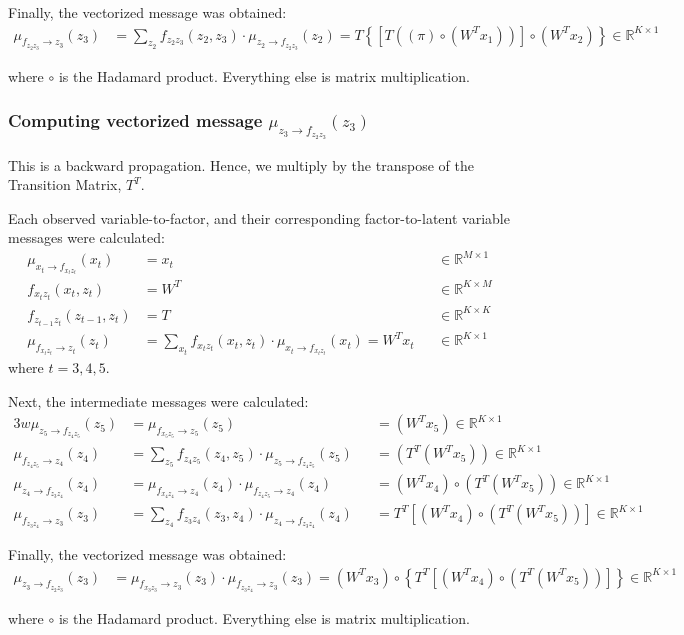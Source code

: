 \documentclass[a4paper,12pt]{article}
\newcommand{\msgNtoF}[2]{\mu_{#1 \rightarrow f_{#2}}(#1)}
\newcommand{\msgFtoN}[2]{\mu_{f_{#1} \rightarrow #2}(#2)}
\newcommand{\factorChris}[2]{f_{#1 #2}(#1, #2)}
\begin{document}
Finally, the vectorized message was obtained:
\begin{align}
\msgFtoN{z_2 z_3}{z_3} & = \sum_{z_2} \factorChris{z_2}{z_3} \cdot \msgNtoF{z_2}{z_2 z_3} = T \left \{ \left[ T \left( (\pi) \circ (W^{T} x_1) \right) \right] \circ \left( W^{T} x_2 \right) \right \} \in \mathbb{R}^{K \times 1}
\end{align}

where $\circ$ is the Hadamard product. Everything else is matrix multiplication.

\clearpage
\subsubsection{Computing vectorized message $\msgNtoF{z_3}{z_2 z_3}$}

This is a backward propagation. Hence, we multiply by the transpose of the Transition Matrix, $T^{T}$. 

Each observed variable-to-factor, and their corresponding factor-to-latent variable messages were calculated:
\begin{align}
\msgNtoF{x_t}{x_t z_t} & = x_t &&\in \mathbb{R}^{M \times 1} \\
\factorChris{x_{t}}{z_{t}} & = W^{T} &&\in \mathbb{R}^{K \times M} \\
\factorChris{z_{t-1}}{z_{t}} & = T &&\in \mathbb{R}^{K \times K}  \\
\msgFtoN{x_t z_t}{z_t} & = \sum_{x_t} \factorChris{x_t}{z_t} \cdot \msgNtoF{x_t}{x_t z_t} = W^{T} x_t && \in \mathbb{R}^{K \times 1}
\end{align}
where $ t = 3, 4, 5 $.

Next, the intermediate messages were calculated:
\begin{alignat}{3}w
\msgNtoF{z_5}{z_4 z_5} & = \msgFtoN{x_5 z_5}{z_5} && = (W^{T} x_5) \in \mathbb{R}^{K \times 1} \\
\msgFtoN{z_4 z_5}{z_4} & = \sum_{z_5} \factorChris{z_4}{z_5} \cdot \msgNtoF{z_5}{z_4 z_5} && = (T^{T} (W^{T} x_5)) \in \mathbb{R}^{K \times 1} \\
\msgNtoF{z_4}{z_3 z_4} & = \msgFtoN{x_4 z_4}{z_4} \cdot \msgFtoN{z_4 z_5}{z_4} && = \left(W^{T}  x_4 \right) \circ \left( T^{T} (W^{T} x_5) \right) \in \mathbb{R}^{K \times 1} \\
\msgFtoN{z_3 z_4}{z_3} & = \sum_{z_4} \factorChris{z_3}{z_4} \cdot \msgNtoF{z_4}{z_3 z_4} && = T^{T} \left[ \left(W^{T}  x_4 \right) \circ \left( T^{T} (W^{T} x_5) \right) \right] \in \mathbb{R}^{K \times 1}
\end{alignat}

Finally, the vectorized message was obtained:
\begin{align}
\msgNtoF{z_3}{z_2 z_3} & = \msgFtoN{x_3 z_3}{z_3} \cdot \msgFtoN{z_3 z_4}{z_3} = \left( W^{T} x_3 \right) \circ  \left \{ T^{T} \left[ \left(W^{T}  x_4 \right) \circ \left( T^{T} (W^{T} x_5) \right) \right] \right \} \in \mathbb{R}^{K \times 1}
\end{align}

where $\circ$ is the Hadamard product.
Everything else is matrix multiplication.
\end{document}
